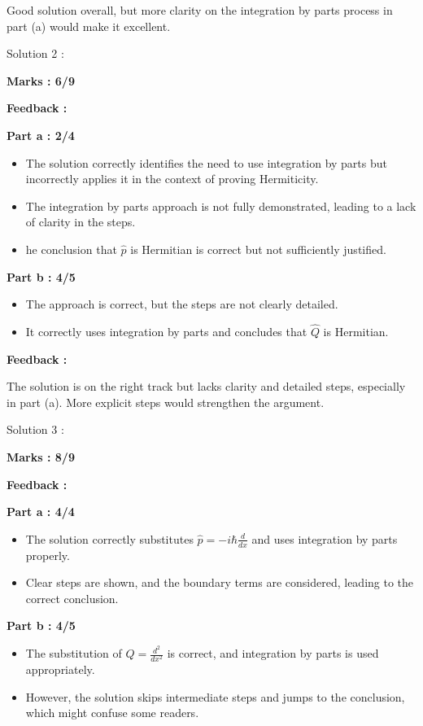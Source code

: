 \documentclass[a4paper,11pt]{article}
\begin{document}
Good solution overall, but more clarity on the integration by parts process in part (a) would make it excellent.



Solution 2 :

\textbf{Marks : 6/9}

\textbf{Feedback :}

\textbf{Part a : 2/4}

\begin{itemize}
    \item The solution correctly identifies the need to use integration by parts but incorrectly applies it in the context of proving Hermiticity.
    \item The integration by parts approach is not fully demonstrated, leading to a lack of clarity in the steps.
    \item he conclusion that $\hat{p}$ is Hermitian is correct but not sufficiently justified.
\end{itemize}


\textbf{Part b : 4/5}

\begin{itemize}
    \item The approach is correct, but the steps are not clearly detailed.
    \item It correctly uses integration by parts and concludes that $\hat{Q}$ is Hermitian.
\end{itemize}

\textbf{Feedback :}

The solution is on the right track but lacks clarity and detailed steps, especially in part (a). More explicit steps would strengthen the argument.



Solution 3 :

\textbf{Marks : 8/9}

\textbf{Feedback :}

\textbf{Part a : 4/4}

\begin{itemize}
    \item The solution correctly substitutes $\hat{p} = -i\hbar \frac{d}{dx}$ and uses integration by parts properly.
    \item Clear steps are shown, and the boundary terms are considered, leading to the correct conclusion.
\end{itemize}


\textbf{Part b : 4/5}

\begin{itemize}
    \item The substitution of $\hat{Q} = \frac{d^2}{dx^2}$ is correct, and integration by parts is used appropriately.
    \item However, the solution skips intermediate steps and jumps to the conclusion, which might confuse some readers.
\end{itemize}
\end{document}
